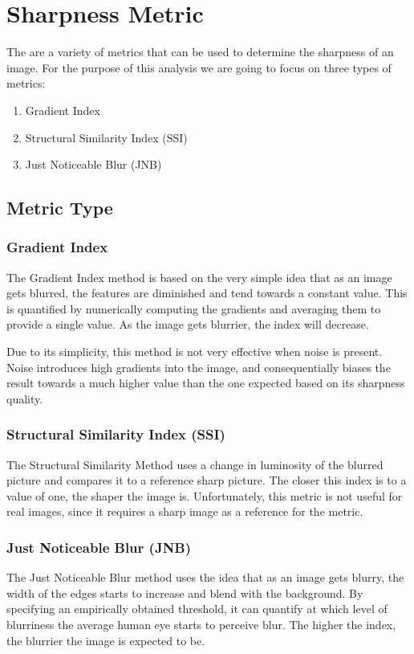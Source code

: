 \graphicspath{{mehul_pics/}}%

\section{Sharpness Metric}

The are a variety of metrics that can be used to determine the sharpness of an image. For the purpose of this analysis we are going to focus on three types of metrics:
\begin{enumerate}
\item Gradient Index
\item Structural Similarity Index (SSI)
\item Just Noticeable  Blur (JNB)
\end{enumerate}  

\subsection{Metric Type}
\subsubsection{Gradient Index} 
The Gradient Index method is based on the very simple idea that as an image gets blurred, the features are diminished and tend towards a constant value. This is quantified by numerically computing the gradients and averaging them to provide a single value. As the image gets blurrier, the index will decrease. 

Due to its simplicity, this method is not very effective when noise is present. Noise introduces high gradients into the image, and consequentially biases the result towards a much higher value than the one expected based on its sharpness quality.  

\subsubsection{Structural Similarity Index (SSI)}
The Structural Similarity Method uses a change in luminosity of the blurred picture and compares it to a reference sharp picture. The closer this index is to a value of one, the shaper the image is. Unfortunately, this metric is not useful for real images, since it requires a sharp image as a reference for the metric.


\subsubsection{Just Noticeable Blur (JNB)}
The Just Noticeable Blur method uses the idea that as an image gets blurry, the width of the edges starts to increase and blend with the background. By specifying an empirically obtained threshold, it can quantify at which level of blurriness the average human eye starts to perceive blur. The higher the index, the blurrier the image is expected to be.

